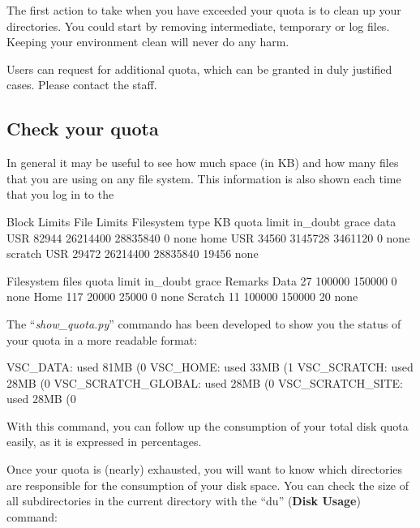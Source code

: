  The first action to take when you have exceeded your quota is
to clean up your directories. You could start by removing intermediate,
temporary or log files.  Keeping your environment clean will never do any harm.

 Users can request for additional quota, which can be granted in
duly justified cases. Please contact the \hpc staff.

\subsection{Check your quota}

In general it may be useful to see how much space (in KB) and how many files
that you are using on any file system.  This information is also shown each
time that you log in to the \hpc

\ifantwerpen
\begin{prompt}
                         Block Limits                                    \textbar      File Limits
Filesystem type KB  quota  limit  in\_doubt   grace
data              USR  82944  26214400 28835840 0       none
home            USR 34560  3145728 3461120 0       none
scratch         USR 29472  26214400 28835840 19456       none

Filesystem files quota  limit  in_doubt grace  Remarks
Data  27 100000 150000 0  none
Home  117 20000  25000  0  none
Scratch 11 100000  150000 20  none
\end{prompt}
\fi

The ``\emph{show\_quota.py}'' commando has been developed to show you the
status of your quota in a more readable format:

\begin{prompt}
VSC_DATA:    used 81MB (0%
VSC_HOME:    used 33MB (1%
VSC_SCRATCH:   used 28MB (0%
VSC_SCRATCH_GLOBAL: used 28MB (0%
VSC_SCRATCH_SITE:   used 28MB (0%
\end{prompt}

With this command, you can follow up the consumption of your total disk quota
easily, as it is expressed in percentages.

Once your quota is (nearly) exhausted, you will want to know which directories
are responsible for the consumption of your disk space. You can check the size
of all subdirectories in the current directory with the ``du'' (\textbf{Disk
Usage}) command:

